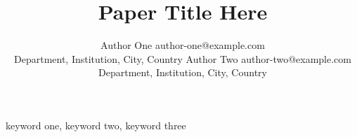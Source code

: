 \documentclass[twoside,11pt]{article}
\begin{document}
\title{Paper Title Here}

\author{\name Author One \email author-one@example.com \\
        \addr Department, Institution, City, Country
        \AND
        \name Author Two \email author-two@example.com \\
        \addr Department, Institution, City, Country}


\maketitle

\begin{abstract}%

\end{abstract}

\begin{keywords}
  keyword one, keyword two, keyword three
\end{keywords}








\vskip 0.2in


\appendix

\end{document}

